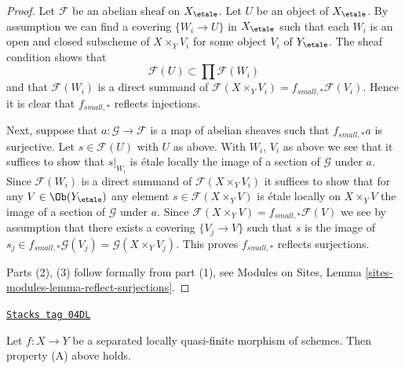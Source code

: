 \begin{proof}
Let $\mathcal{F}$ be an abelian sheaf on $X_\etale$.
Let $U$ be an object of $X_\etale$. By assumption we can find a
covering $\{W_i \to U\}$ in $X_\etale$ such that each $W_i$ is
an open and closed subscheme of $X \times_Y V_i$ for some object
$V_i$ of $Y_\etale$. The sheaf condition shows that
$$
\mathcal{F}(U) \subset \prod \mathcal{F}(W_i)
$$
and that $\mathcal{F}(W_i)$ is a direct summand of
$\mathcal{F}(X \times_Y V_i) = f_{small, *}\mathcal{F}(V_i)$.
Hence it is clear that $f_{small, *}$ reflects injections.

\medskip\noindent
Next, suppose that $a : \mathcal{G} \to \mathcal{F}$ is a map of
abelian sheaves such that $f_{small, *}a$ is surjective. Let
$s \in \mathcal{F}(U)$ with $U$ as above. With $W_i$, $V_i$ as
above we see that it suffices to show that $s|_{W_i}$ is \'etale locally
the image of a section of $\mathcal{G}$ under $a$. Since $\mathcal{F}(W_i)$
is a direct summand of $\mathcal{F}(X \times_Y V_i)$
it suffices to show that for any $V \in \Ob(Y_\etale)$
any element $s \in \mathcal{F}(X \times_Y V)$
is \'etale locally on $X \times_Y V$ the image of a section of
$\mathcal{G}$ under $a$. Since
$\mathcal{F}(X \times_Y V) = f_{small, *}\mathcal{F}(V)$
we see by assumption that there exists a covering $\{V_j \to V\}$ such that
$s$ is the image of
$s_j \in f_{small, *}\mathcal{G}(V_j) = \mathcal{G}(X \times_Y V_j)$.
This proves $f_{small, *}$ reflects surjections.

\medskip\noindent
Parts (2), (3) follow formally from part (1), see
Modules on Sites, Lemma \ref{sites-modules-lemma-reflect-surjections}.
\end{proof}

\begin{lemma}
\label{etale-cohomology-lemma-locally-quasi-finite-A}
\href{https://stacks.math.columbia.edu/tag/04DL}{\texttt{Stacks tag 04DL}}

Let $f : X \to Y$ be a separated locally quasi-finite morphism of schemes.
Then property (A) above holds.
\end{lemma}

